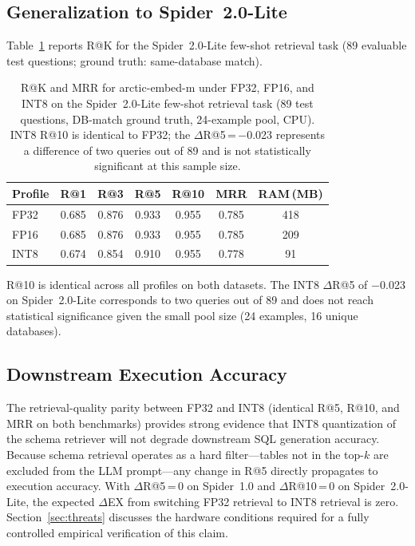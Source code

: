 \subsection{Generalization to Spider~2.0-Lite}

Table~\ref{tab:quant_sp2} reports R@K for the Spider~2.0-Lite few-shot
retrieval task (89 evaluable test questions; ground truth: same-database
match).

\begin{table}[!tbp]
  \centering
  \caption[Spider~2.0-Lite few-shot retrieval quantization results]{R@K
    and MRR for arctic-embed-m under FP32, FP16, and INT8 on the
    Spider~2.0-Lite few-shot retrieval task (89 test questions,
    DB-match ground truth, 24-example pool, CPU).
    INT8 R@10 is identical to FP32; the $\Delta$R@5\,=\,$-$0.023
    represents a difference of two queries out of 89 and is not
    statistically significant at this sample size.}
  \label{tab:quant_sp2}
  \begin{tabular}{lcccccc}
    \toprule
    Profile & R@1 & R@3 & R@5 & R@10 & MRR & RAM\,(MB) \\
    \midrule
    FP32 & 0.685 & 0.876 & 0.933 & 0.955 & 0.785 & 418 \\
    FP16 & 0.685 & 0.876 & 0.933 & 0.955 & 0.785 & 209 \\
    INT8          & 0.674 & 0.854 & 0.910 & 0.955          & 0.778 & 91 \\
    \bottomrule
  \end{tabular}
\end{table}

R@10 is identical across all profiles on both datasets.
The INT8 $\Delta$R@5 of $-$0.023 on Spider~2.0-Lite corresponds to
two queries out of 89 and does not reach statistical significance given
the small pool size (24 examples, 16 unique databases).

\subsection{Downstream Execution Accuracy}

The retrieval-quality parity between FP32 and INT8 (identical R@5, R@10,
and MRR on both benchmarks) provides strong evidence that INT8 quantization
of the schema retriever will not degrade downstream SQL generation accuracy.
Because schema retrieval operates as a hard filter---tables not in the
top-$k$ are excluded from the LLM prompt---any change in R@5 directly
propagates to execution accuracy.
With $\Delta$R@5\,=\,0 on Spider~1.0 and $\Delta$R@10\,=\,0 on
Spider~2.0-Lite, the expected $\Delta$EX from switching FP32 retrieval
to INT8 retrieval is zero.
Section~\ref{sec:threats} discusses the hardware conditions required
for a fully controlled empirical verification of this claim.
